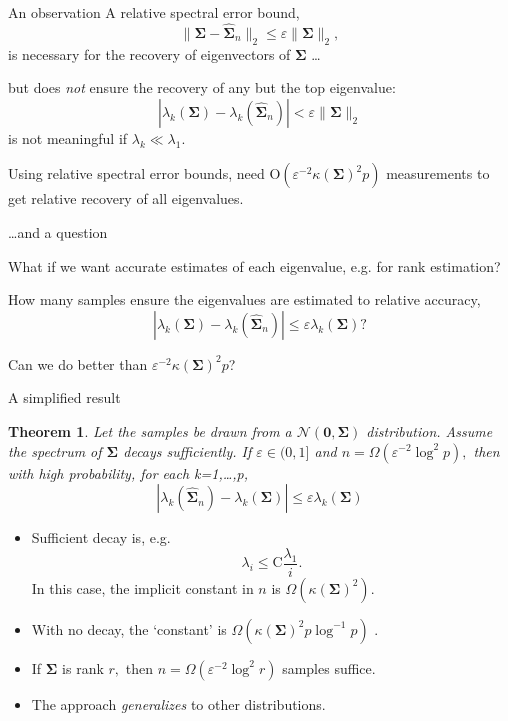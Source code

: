 \documentclass[xcolor={svgnames,pdftex,dvipsnames,table},10pt]{beamer} %
\newcommand{\mat}[1]{\ensuremath{\mathbf{#1}}}
\newtheorem*{thm}{Theorem}
\begin{document}
\begin{frame}{An observation}
A relative spectral error bound,
\[
\|\mat{\Sigma} - \widehat{\mat{\Sigma}}_n\|_2 \leq \varepsilon \|\mat{\Sigma}\|_2,
\]
is necessary for the recovery of eigenvectors of $\mat{\Sigma}$ \dots

\vspace{1em}
\pause
but does \emph{not} ensure the recovery of any but the top eigenvalue:
\[
|\lambda_k(\mat{\Sigma}) - \lambda_k(\widehat{\mat{\Sigma}}_n)| < \varepsilon \|\mat{\Sigma}\|_2 
\]
is not meaningful if $\lambda_k \ll \lambda_1.$

\vspace{1em}
\pause
Using relative spectral error bounds, need O$(\varepsilon^{-2} \kappa(\mat{\Sigma})^2 p)$ measurements to get relative recovery of all eigenvalues.
\end{frame}

\begin{frame}{\dots and a question}

What if we want accurate estimates of each eigenvalue, e.g. for rank estimation?
\vspace{1em}
\begin{displaybox}{0.7\textwidth}
\parbox{\textwidth}{%
How many samples ensure the eigenvalues are estimated to relative accuracy,
\[
|\lambda_k(\mat{\Sigma}) - \lambda_k(\widehat{\mat{\Sigma}}_n)| \leq \varepsilon \lambda_k(\mat{\Sigma})?
\]
}
\end{displaybox}

\vspace{1em}
Can we do better than $\varepsilon^{-2} \kappa(\mat{\Sigma})^2 p$?

\end{frame}

\begin{frame}{A simplified result}

\begin{thm}
Let the samples be drawn from a $\mathcal{N}(\mat{0}, \mat{\Sigma})$ distribution. Assume the spectrum of $\mat{\Sigma}$ decays sufficiently. If $\varepsilon \in (0, 1]$ and $n = \Omega(\varepsilon^{-2} \log^2 p),$ then with high probability, for each k=1,\ldots,p,
\[
|\lambda_k(\widehat{\mat{\Sigma}}_n) - \lambda_k(\mat{\Sigma})| \leq \varepsilon \lambda_k(\mat{\Sigma}) 
\]
\end{thm}

\begin{itemize}
\pause
	\item Sufficient decay is, e.g. 
	\[ \lambda_i \leq \mathrm{C} \frac{\lambda_1}{i}. 
	\] 
	In this case, the implicit constant in $n$ is $\Omega(\kappa(\mat{\Sigma})^2).$
	\pause
	\item With no decay, the `constant' is $\Omega(\kappa(\mat{\Sigma})^2 p \log^{-1}p )$ .
	\pause
	\item If $\mat{\Sigma}$ is rank $r,$ then $n= \Omega(\varepsilon^{-2} \log^2 r)$ samples suffice.
	\pause
	\item The approach \emph{generalizes} to other distributions.
\end{itemize}

\end{frame}
\end{document}

